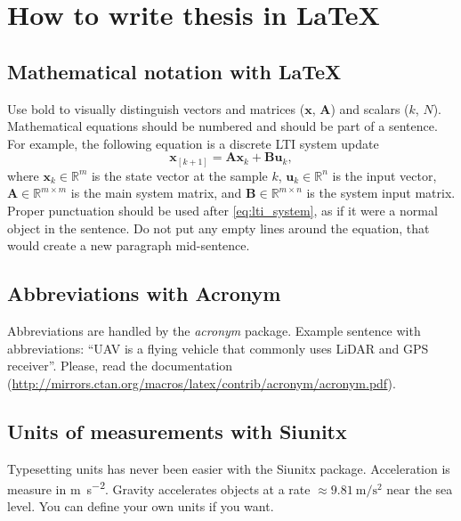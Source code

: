 
\chapter{How to write thesis in LaTeX\label{chap:how_to}}

\section{Mathematical notation with LaTeX}

Use bold to visually distinguish vectors and matrices ($\mathbf{x}$, $\mathbf{A}$) and scalars ($k$, $N$).
Mathematical equations should be numbered and should be part of a sentence.
For example, the following equation is a discrete LTI system update
\begin{equation}
  \mathbf{x}_{\left[k+1\right]} = \mathbf{A}\mathbf{x}_k + \mathbf{B}\mathbf{u}_k,
  \label{eq:lti_system}
\end{equation}
where $\mathbf{x}_k \in \mathbb{R}^m$ is the state vector at the sample $k$, $\mathbf{u}_k \in \mathbb{R}^n$ is the input vector, $\mathbf{A} \in \mathbb{R}^{m \times m}$ is the main system matrix, and $\mathbf{B} \in \mathbb{R}^{m \times n}$ is the system input matrix.
Proper punctuation should be used after \eqref{eq:lti_system}, as if it were a normal object in the sentence.
Do not put any empty lines around the equation, that would create a new paragraph mid-sentence.

\section{Abbreviations with Acronym}

Abbreviations are handled by the \emph{acronym} package.
Example sentence with abbreviations: ``\ac{UAV} is a flying vehicle that commonly uses \ac{LiDAR} and \ac{GPS} receiver''.
Please, read the documentation (\url{http://mirrors.ctan.org/macros/latex/contrib/acronym/acronym.pdf}).

\section{Units of measurements with Siunitx}

Typesetting units has never been easier with the Siunitx package.
Acceleration is measure in \si{\meter\per\second\squared}.
Gravity accelerates objects at a rate $\approx \SI{9.81}{\meter\per\second\squared}$ near the sea level.
You can define your own units if you want.

